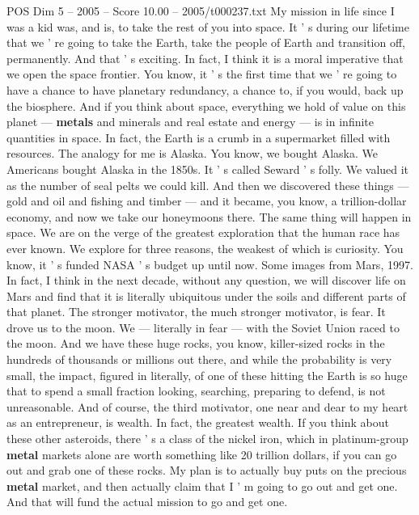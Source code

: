 \begin{textsample}{POS Dim 5 – 2005 – Score 10.00 – 2005/t000237.txt}  \label{ex:f5_pos_009}
My mission in life since I was a kid was, and is, to take the rest of you into space.
It ' s during our lifetime that we ' re going to take the Earth, take the people of Earth and transition off, permanently.
And that ' s exciting.
In fact, I think it is a moral imperative that we open the space frontier.
You know, it ' s the first time that we ' re going to have a chance to have planetary redundancy, a chance to, if you would, back up the biosphere.
And if you think about space, everything we hold of value on this planet — \textbf{metals} and minerals and real estate and energy — is in infinite quantities in space.
In fact, the Earth is a crumb in a supermarket filled with resources.
The analogy for me is Alaska.
You know, we bought Alaska.
We Americans bought Alaska in the 1850s.
It ' s called Seward ' s folly.
We valued it as the number of seal pelts we could kill.
And then we discovered these things — gold and oil and fishing and timber — and it became, you know, a trillion-dollar economy, and now we take our honeymoons there.
The same thing will happen in space.
We are on the verge of the greatest exploration that the human race has ever known.
We explore for three reasons, the weakest of which is curiosity.
You know, it ' s funded NASA ' s budget up until now.
Some images from Mars, 1997.
In fact, I think in the next decade, without any question, we will discover life on Mars and find that it is literally ubiquitous under the soils and different parts of that planet.
The stronger motivator, the much stronger motivator, is fear.
It drove us to the moon.
We — literally in fear — with the Soviet Union raced to the moon.
And we have these huge rocks, you know, killer-sized rocks in the hundreds of thousands or millions out there, and while the probability is very small, the impact, figured in literally, of one of these hitting the Earth is so huge that to spend a small fraction looking, searching, preparing to defend, is not unreasonable.
And of course, the third motivator, one near and dear to my heart as an entrepreneur, is wealth.
In fact, the greatest wealth.
If you think about these other asteroids, there ' s a class of the nickel iron, which in platinum-group \textbf{metal} markets alone are worth something like 20 trillion dollars, if you can go out and grab one of these rocks.
My plan is to actually buy puts on the precious \textbf{metal} market, and then actually claim that I ' m going to go out and get one.
And that will fund the actual mission to go and get one.

\end{textsample}
